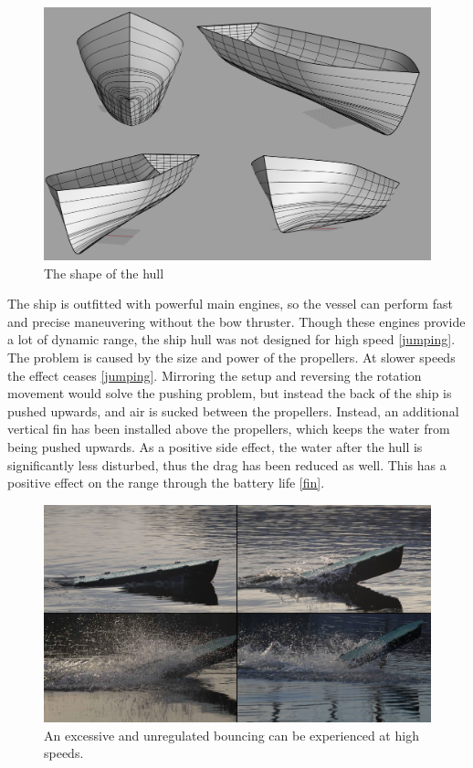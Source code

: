 \begin{figure}[hullshape]
	\centering
	\includegraphics[width=\textwidth]{img/render/rendermontage.png}
	\caption{The shape of the hull}
	\label{fig:vessel-block-overview}
\end{figure}

The ship is outfitted with powerful main engines, so the vessel can perform fast and precise maneuvering without the bow thruster. Though these engines provide a lot of dynamic range, the ship hull was not designed for high speed \ref{jumping}. The problem is caused by the size and power of the propellers. At slower speeds the effect ceases \ref{jumping}.
Mirroring the setup and reversing the rotation movement would solve the pushing problem, but instead the back of the ship is pushed upwards, and air is sucked between the propellers. Instead, an additional vertical fin has been installed above the propellers, which keeps the water from being pushed upwards. As a positive side effect, the water after the hull is significantly less disturbed, thus the drag has been reduced as well. This has a positive effect on the range through the battery life \ref{fin}.

\begin{figure}[jumping]
	\centering
	\includegraphics[width=\textwidth]{Pictures/VerticalJumpingTele.jpg}
	\caption{An excessive and unregulated bouncing can be experienced at high speeds.}
	\label{fig:vessel-block-overview}
\end{figure}

